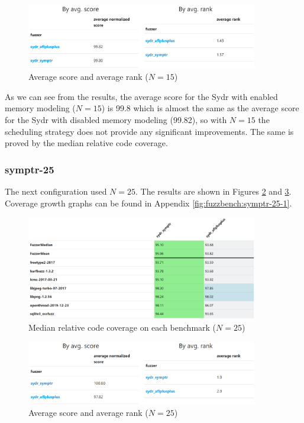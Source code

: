 \begin{figure}[h]
    \centering
    \includegraphics[width=0.9\textwidth]{assets/fuzzbench/symptr-15-1/avg-score-avg-rank.png}
    \caption{Average score and average rank ($N=15$)}
    \label{fig:fuzzbench-symptr-15-1-score-rank}
\end{figure}

As we can see from the results, the average score for the Sydr with enabled memory modeling ($N=15$) is 99.8 which is almost the same as the average score for the Sydr with disabled memory modeling (99.82), so with $N=15$ the scheduling strategy does not provide any significant improvements. The same is proved by the median relative code coverage.

\subsubsection{symptr-25}

The next configuration used $ N = 25 $. The results are shown in Figures \ref{fig:fuzzbench-symptr-25-1-coverage} and \ref{fig:fuzzbench-symptr-25-1-score-rank}. Coverage growth graphs can be found in Appendix \ref{fig:fuzzbench:symptr-25-1}.

\begin{figure}[h]
    \centering
    \includegraphics[width=0.9\textwidth]{assets/fuzzbench/symptr-25-1/median-relative-code-coverage-on-each-benchmark.png}
    \caption{Median relative code coverage on each benchmark ($N=25$)}
    \label{fig:fuzzbench-symptr-25-1-coverage}
\end{figure}

\begin{figure}[h]
    \centering
    \includegraphics[width=0.9\textwidth]{assets/fuzzbench/symptr-25-1/avg-score-avg-rank.png}
    \caption{Average score and average rank ($N=25$)}
    \label{fig:fuzzbench-symptr-25-1-score-rank}
\end{figure}

